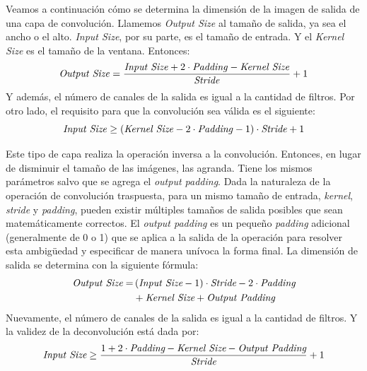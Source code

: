 Veamos a continuación cómo se determina la dimensión de la imagen de salida de una capa de convolución. Llamemos \emph{Output Size} al tamaño de salida, ya sea el ancho o el alto. \emph{Input Size}, por su parte, es el tamaño de entrada. Y el \emph{Kernel Size} es el tamaño de la ventana. Entonces:
\begin{equation}
    \text{\emph{Output Size}} = \frac{\text{\emph{Input Size}} + 2 \cdot \text{\emph{Padding}} - \text{\emph{Kernel Size}}}{\text{\emph{Stride}}} + 1
\end{equation}
Y además, el número de canales de la salida es igual a la cantidad de filtros. Por otro lado, el requisito para que la convolución sea válida es el siguiente:
\begin{equation}
    \text{\emph{Input Size}} \geq (\text{\emph{Kernel Size}} - 2 \cdot \text{\emph{Padding}} - 1) \cdot \text{\emph{Stride}} + 1
\end{equation}

Este tipo de capa realiza la operación inversa a la convolución. Entonces, en lugar de disminuir el tamaño de las imágenes, las agranda. Tiene los mismos parámetros salvo que se agrega el \emph{output padding}. Dada la naturaleza de la operación de convolución traspuesta, para un mismo tamaño de entrada, \emph{kernel}, \emph{stride} y \emph{padding}, pueden existir múltiples tamaños de salida posibles que sean matemáticamente correctos. El \emph{output padding} es un pequeño \emph{padding} adicional (generalmente de 0 o 1) que se aplica a la salida de la operación para resolver esta ambigüedad y especificar de manera unívoca la forma final. La dimensión de salida se determina con la siguiente fórmula:
\begin{equation}
\begin{split}
    \emph{\text{Output Size}} = &\, (\emph{\text{Input Size}} - 1) \cdot \emph{\text{Stride}} - 2 \cdot \emph{\text{Padding}} \\
                         & + \emph{\text{Kernel Size}} + \emph{\text{Output Padding}}
\end{split}
\end{equation}
Nuevamente, el número de canales de la salida es igual a la cantidad de filtros. Y la validez de la deconvolución está dada por:
\begin{equation}
    \emph{\text{Input Size}} \geq \frac{1 + 2\cdot\emph{\text{Padding}} - \emph{\text{Kernel Size}} - \emph{\text{Output Padding}}}{\emph{\text{Stride}}} + 1
\end{equation}

